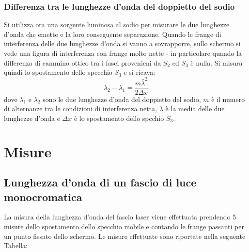 \documentclass[]{article}
\let\oldsection\section%
\renewcommand{\section}{%
	\renewcommand{\theequation}{\thesection.\arabic{equation}}%
	\oldsection}%
\let\oldsubsection\subsection%
\renewcommand{\subsection}{%
	\renewcommand{\theequation}{\thesubsection.\arabic{equation}}%
	\oldsubsection}%
\begin{document}
\subsubsection{Differenza tra le lunghezze d'onda del doppietto del sodio}

Si utilizza ora una sorgente luminosa al sodio per misurare le due lunghezze d'onda che emette e la loro conseguente separazione. Quando le frange di interferenza delle due lunghezze d'onda si vanno a sovrapporre, sullo schermo si vede una figura di interferenza con frange molto nette - in particolare quando la differenza di cammino ottico tra i fasci provenieni da $S_2$ ed $S_3$ è nulla. 
Si misura quindi lo spostamento dello specchio $S_3$ e si ricava:
\begin{equation}
    \label{Delta_lambda}
    \lambda _2 - \lambda _1 = \frac {m \bar{\lambda} ^2 }{2 \Delta x}
\end{equation}
dove $\lambda _1$ e $\lambda _2$ sono le due lunghezze d'onda del doppietto del sodio, $m$ è il numero di alternanze tra le condizioni di interferenza netta, $\bar{\lambda}$ è la media delle due lunghezze d'onda e $\Delta x$ è lo spostamento dello spcchio $S_3$.

\section{Misure}

\subsection {Lunghezza d'onda di un fascio di luce monocromatica}

La misura della lunghezza d'onda del fascio laser viene effettuata prendendo 5 misure dello spostamento dello specchio mobile e contando le frange passanti per un punto fissato dello schermo. Le misure effettuate sono riportate nella seguente Tabella:
\end{document}
